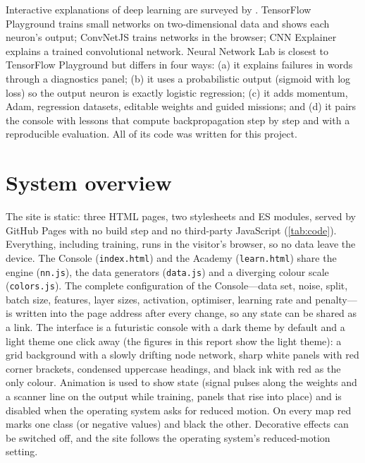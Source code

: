 \documentclass[11pt,a4paper]{article}
\newcommand{\code}[1]{\texttt{\small #1}}
\begin{document}
Interactive explanations of deep learning are surveyed by \citet{hohman2019visual}. TensorFlow Playground \citep{smilkov2017playground} trains small networks on two-dimensional data and shows each neuron's output; ConvNetJS \citep{karpathy_convnetjs} trains networks in the browser; CNN Explainer \citep{wang2020cnnexplainer} explains a trained convolutional network. Neural Network Lab is closest to TensorFlow Playground but differs in four ways: (a) it explains failures in words through a diagnostics panel; (b) it uses a probabilistic output (sigmoid with log loss) so the output neuron is exactly logistic regression; (c) it adds momentum, Adam, regression datasets, editable weights and guided missions; and (d) it pairs the console with lessons that compute backpropagation step by step and with a reproducible evaluation. All of its code was written for this project.

\section{System overview}\label{sec:overview}

The site is static: three HTML pages, two stylesheets and ES modules, served by GitHub Pages with no build step and no third-party JavaScript (\cref{tab:code}). Everything, including training, runs in the visitor's browser, so no data leave the device. The Console (\code{index.html}) and the Academy (\code{learn.html}) share the engine (\code{nn.js}), the data generators (\code{data.js}) and a diverging colour scale (\code{colors.js}). The complete configuration of the Console---data set, noise, split, batch size, features, layer sizes, activation, optimiser, learning rate and penalty---is written into the page address after every change, so any state can be shared as a link. The interface is a futuristic console with a dark theme by default and a light theme one click away (the figures in this report show the light theme): a grid background with a slowly drifting node network, sharp white panels with red corner brackets, condensed uppercase headings, and black ink with red as the only colour. Animation is used to show state (signal pulses along the weights and a scanner line on the output while training, panels that rise into place) and is disabled when the operating system asks for reduced motion. On every map red marks one class (or negative values) and black the other. Decorative effects can be switched off, and the site follows the operating system's reduced-motion setting.
\end{document}
